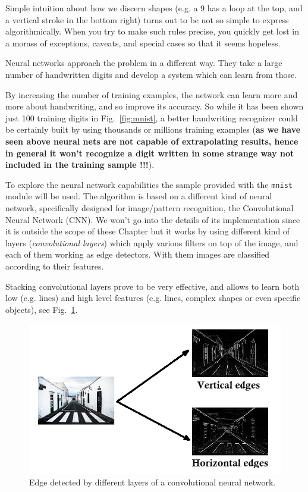 Simple intuition about how we discern shapes (e.g. a 9 has a loop at the top, and a vertical stroke in the bottom right) turns out to be not so simple to express algorithmically. When you try to make such rules precise, you quickly get lost in a morass of exceptions, caveats, and special cases so that it seems hopeless.

Neural networks approach the problem in a different way. They take a large number of handwritten digits and develop a system which can learn from those.

By increasing the number of training examples, the network can learn more and more about handwriting, and so improve its accuracy. So while it has been shown just 100 training digits in Fig.~\ref{fig:mnist}, a better handwriting recognizer could be certainly built by using thousands or millions training examples (\textbf{as we have seen above neural nets are not capable of extrapolating results, hence in general it won't recognize a digit written in some strange way not included in the training sample !!!}).

To explore the neural network capabilities the sample provided with the \texttt{mnist} module will be used. 
The algorithm is based on a different kind of neural network, specifically designed for image/pattern recognition, the Convolutional Neural Network (CNN). We won't go into the details of its implementation since it is outside the scope of these Chapter but it works by using different kind of layers (\emph{convolutional layers}) which apply various filters on top of the image, and each of them working as edge detectors. With them images are classified according to their features.

Stacking convolutional layers prove to be very effective, and allows to learn both low (e.g. lines) and high level features (e.g. lines, complex shapes or even specific objects), see Fig.~\ref{fig:conv_filters}.

\begin{figure}[htb]
\centering
\includegraphics[width=1.\textwidth]{figures/edges.jpg}
\caption{Edge detected by different layers of a convolutional neural network.}
\label{fig:conv_filters}
\end{figure}

